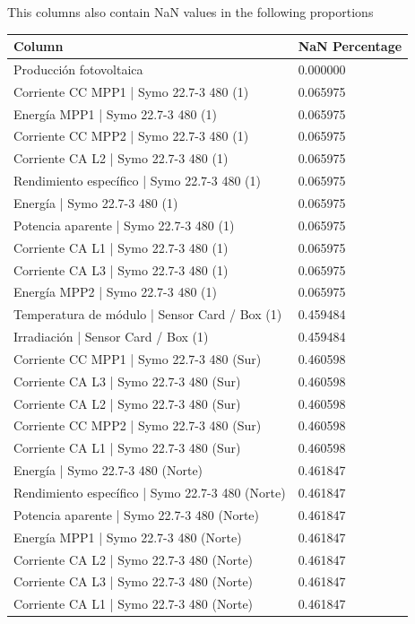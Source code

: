 \documentclass[a4paper,12pt]{article}
\begin{document}
This columns also contain NaN values in the following proportions
\begin{table}[H] %
\centering
\begin{tabular}{ll}
\toprule
\textbf{Column} & \textbf{NaN Percentage} \\
\midrule
Producción fotovoltaica & 0.000000 \\
Corriente CC MPP1 | Symo 22.7-3 480 (1) & 0.065975 \\
Energía MPP1 | Symo 22.7-3 480 (1) & 0.065975 \\
Corriente CC MPP2 | Symo 22.7-3 480 (1) & 0.065975 \\
Corriente CA L2 | Symo 22.7-3 480 (1) & 0.065975 \\
Rendimiento específico | Symo 22.7-3 480 (1) & 0.065975 \\
Energía | Symo 22.7-3 480 (1) & 0.065975 \\
Potencia aparente | Symo 22.7-3 480 (1) & 0.065975 \\
Corriente CA L1 | Symo 22.7-3 480 (1) & 0.065975 \\
Corriente CA L3 | Symo 22.7-3 480 (1) & 0.065975 \\
Energía MPP2 | Symo 22.7-3 480 (1) & 0.065975 \\
Temperatura de módulo | Sensor Card / Box (1) & 0.459484 \\
Irradiación | Sensor Card / Box (1) & 0.459484 \\
Corriente CC MPP1 | Symo 22.7-3 480 (Sur) & 0.460598 \\
Corriente CA L3 | Symo 22.7-3 480 (Sur) & 0.460598 \\
Corriente CA L2 | Symo 22.7-3 480 (Sur) & 0.460598 \\
Corriente CC MPP2 | Symo 22.7-3 480 (Sur) & 0.460598 \\
Corriente CA L1 | Symo 22.7-3 480 (Sur) & 0.460598 \\
Energía | Symo 22.7-3 480 (Norte) & 0.461847 \\
Rendimiento específico | Symo 22.7-3 480 (Norte) & 0.461847 \\
Potencia aparente | Symo 22.7-3 480 (Norte) & 0.461847 \\
Energía MPP1 | Symo 22.7-3 480 (Norte) & 0.461847 \\
Corriente CA L2 | Symo 22.7-3 480 (Norte) & 0.461847 \\
Corriente CA L3 | Symo 22.7-3 480 (Norte) & 0.461847 \\
Corriente CA L1 | Symo 22.7-3 480 (Norte) & 0.461847 \\

\end{tabular}
\end{table}
\end{document}
